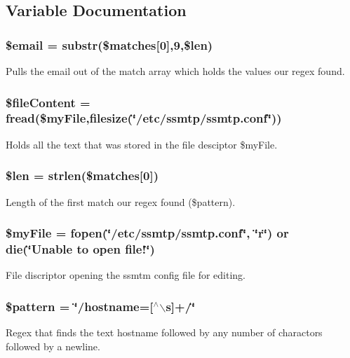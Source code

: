 \subsection{\-Variable \-Documentation}
\hypertarget{getEmail_8php_ad634f418b20382e2802f80532d76d3cd}{
\subsubsection[{\$email}]{\setlength{\rightskip}{0pt plus 5cm}\$email = substr(\$matches\mbox{[}0\mbox{]},9,\$len)}}\label{getEmail_8php_ad634f418b20382e2802f80532d76d3cd}
\-Pulls the email out of the match array which holds the values our regex found. \hypertarget{getEmail_8php_ad89080bb6e501b4f254f01ee5d24fa2d}{
\subsubsection[{\$file\-Content}]{\setlength{\rightskip}{0pt plus 5cm}\$file\-Content = fread(\$my\-File,filesize(\char`\"{}/etc/ssmtp/ssmtp.\-conf\char`\"{}))}}\label{getEmail_8php_ad89080bb6e501b4f254f01ee5d24fa2d}
\-Holds all the text that was stored in the file desciptor \$my\-File. \hypertarget{getEmail_8php_aa28657aaa5fcc7509dd883662f8accbe}{
\subsubsection[{\$len}]{\setlength{\rightskip}{0pt plus 5cm}\$len = strlen(\$matches\mbox{[}0\mbox{]})}}\label{getEmail_8php_aa28657aaa5fcc7509dd883662f8accbe}
\-Length of the first match our regex found (\$pattern). \hypertarget{getEmail_8php_aec8c77a99462294dbbfb1639bd8b5165}{
\subsubsection[{\$my\-File}]{\setlength{\rightskip}{0pt plus 5cm}\$my\-File = fopen(\char`\"{}/etc/ssmtp/ssmtp.\-conf\char`\"{}, \char`\"{}r\char`\"{}) or die(\char`\"{}\-Unable to open file!\char`\"{})}}\label{getEmail_8php_aec8c77a99462294dbbfb1639bd8b5165}
\-File discriptor opening the ssmtm config file for editing. \hypertarget{getEmail_8php_af6fbb70c99c1f5a92778615a2a9861e6}{
\subsubsection[{\$pattern}]{\setlength{\rightskip}{0pt plus 5cm}\$pattern = \char`\"{}/hostname=\mbox{[}$^\wedge$$\backslash$s\mbox{]}+/\char`\"{}}}\label{getEmail_8php_af6fbb70c99c1f5a92778615a2a9861e6}
\-Regex that finds the text hostname followed by any number of charactors followed by a newline. 